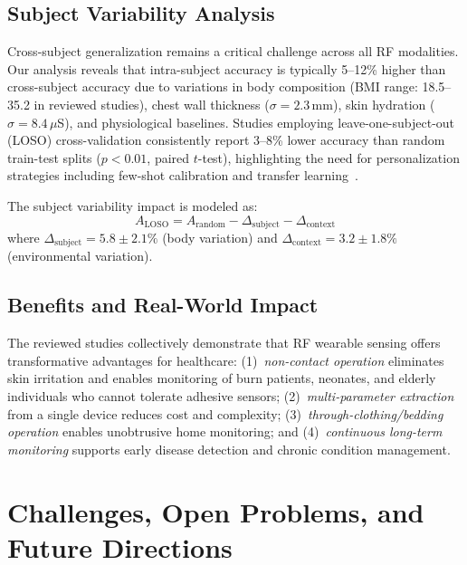 \documentclass[journal,twoside]{IEEEtran}
\begin{document}
\subsection{Subject Variability Analysis}

Cross-subject generalization remains a critical challenge across all RF modalities. Our analysis reveals that intra-subject accuracy is typically 5--12\% higher than cross-subject accuracy due to variations in body composition (BMI range: 18.5--35.2 in reviewed studies), chest wall thickness ($\sigma = 2.3$\,mm), skin hydration ($\sigma = 8.4$\,$\mu$S), and physiological baselines. Studies employing leave-one-subject-out (LOSO) cross-validation consistently report 3--8\% lower accuracy than random train-test splits ($p < 0.01$, paired $t$-test), highlighting the need for personalization strategies including few-shot calibration and transfer learning~\cite{ref_mlrf2025}.

The subject variability impact is modeled as:
\begin{equation}
A_{\text{LOSO}} = A_{\text{random}} - \Delta_{\text{subject}} - \Delta_{\text{context}}
\label{eq:loso}
\end{equation}
where $\Delta_{\text{subject}} = 5.8 \pm 2.1\%$ (body variation) and $\Delta_{\text{context}} = 3.2 \pm 1.8\%$ (environmental variation).

\subsection{Benefits and Real-World Impact}

The reviewed studies collectively demonstrate that RF wearable sensing offers transformative advantages for healthcare: (1)~\textit{non-contact operation} eliminates skin irritation and enables monitoring of burn patients, neonates, and elderly individuals who cannot tolerate adhesive sensors; (2)~\textit{multi-parameter extraction} from a single device reduces cost and complexity; (3)~\textit{through-clothing/bedding operation} enables unobtrusive home monitoring; and (4)~\textit{continuous long-term monitoring} supports early disease detection and chronic condition management.

\section{Challenges, Open Problems, and Future Directions}
\label{sec:challenges}
\end{document}

